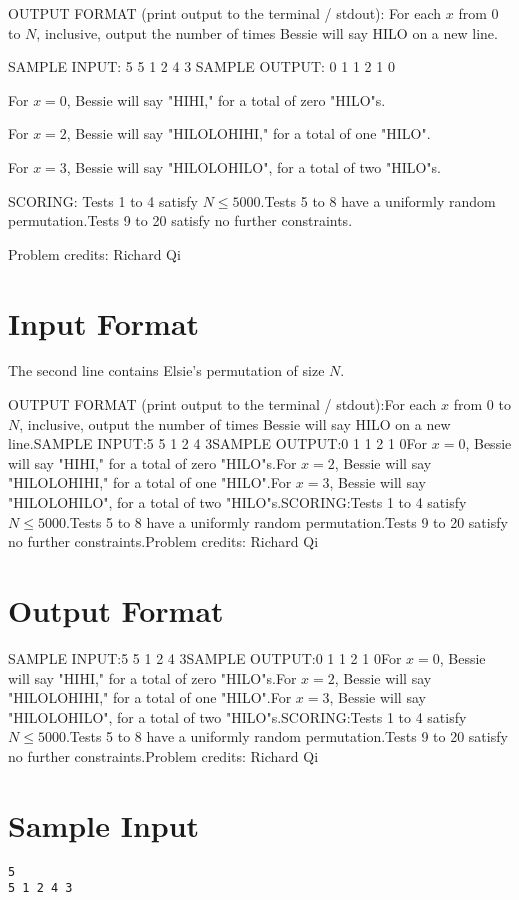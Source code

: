 \documentclass[12pt]{article}
\begin{document}
OUTPUT FORMAT (print output to the terminal / stdout):
For each $x$ from $0$ to $N$, inclusive, output the number of times Bessie will
say HILO on a new line.

SAMPLE INPUT:
5
5 1 2 4 3
SAMPLE OUTPUT: 
0
1
1
2
1
0

For $x=0$, Bessie will say "HIHI," for a total of zero "HILO"s.

For $x=2$, Bessie will say "HILOLOHIHI," for a total of one "HILO".

For $x=3$, Bessie will say "HILOLOHILO", for a total of two "HILO"s.

SCORING:
Tests 1 to 4 satisfy $N \leq 5000$.Tests 5 to 8 have a uniformly
random permutation.Tests 9 to 20 satisfy no further constraints.


Problem credits: Richard Qi



\section*{Input Format}
The second line contains Elsie's permutation of size $N.$

OUTPUT FORMAT (print output to the terminal / stdout):For each $x$ from $0$ to $N$, inclusive, output the number of times Bessie will
say HILO on a new line.SAMPLE INPUT:5
5 1 2 4 3SAMPLE OUTPUT:0
1
1
2
1
0For $x=0$, Bessie will say "HIHI," for a total of zero "HILO"s.For $x=2$, Bessie will say "HILOLOHIHI," for a total of one "HILO".For $x=3$, Bessie will say "HILOLOHILO", for a total of two "HILO"s.SCORING:Tests 1 to 4 satisfy $N \leq 5000$.Tests 5 to 8 have a uniformly
random permutation.Tests 9 to 20 satisfy no further constraints.Problem credits: Richard Qi

\section*{Output Format}
SAMPLE INPUT:5
5 1 2 4 3SAMPLE OUTPUT:0
1
1
2
1
0For $x=0$, Bessie will say "HIHI," for a total of zero "HILO"s.For $x=2$, Bessie will say "HILOLOHIHI," for a total of one "HILO".For $x=3$, Bessie will say "HILOLOHILO", for a total of two "HILO"s.SCORING:Tests 1 to 4 satisfy $N \leq 5000$.Tests 5 to 8 have a uniformly
random permutation.Tests 9 to 20 satisfy no further constraints.Problem credits: Richard Qi

\section*{Sample Input}
\begin{verbatim}
5
5 1 2 4 3
\end{verbatim}
\end{document}
